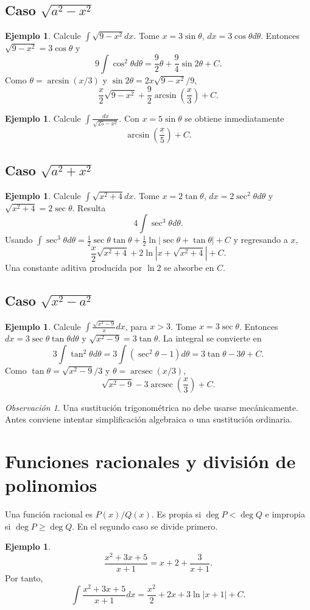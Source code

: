 \documentclass[12pt]{article}
\theoremstyle{definition}
\newtheorem{ejemplo}[teorema]{Ejemplo}
\theoremstyle{remark}
\newtheorem*{observacion}{Observación}
\begin{document}
\subsection*{Caso $\sqrt{a^2-x^2}$}
\begin{ejemplo}Calcule $\int\sqrt{9-x^2}dx$. Tome $x=3\sin\theta$, $dx=3\cos\theta d\theta$. Entonces $\sqrt{9-x^2}=3\cos\theta$ y
\[9\int\cos^2\theta d\theta=\frac92\theta+\frac94\sin2\theta+C.\]
Como $\theta=\arcsin(x/3)$ y $\sin2\theta=2x\sqrt{9-x^2}/9$,
\[\boxed{\frac{x}{2}\sqrt{9-x^2}+\frac92\arcsin\left(\frac{x}{3}\right)+C}.\]\end{ejemplo}
\begin{ejemplo}Calcule $\int\frac{dx}{\sqrt{25-x^2}}$. Con $x=5\sin\theta$ se obtiene inmediatamente
\[\boxed{\arcsin\left(\frac{x}{5}\right)+C}.\]\end{ejemplo}
\subsection*{Caso $\sqrt{a^2+x^2}$}
\begin{ejemplo}Calcule $\int\sqrt{x^2+4}dx$. Tome $x=2\tan\theta$, $dx=2\sec^2\theta d\theta$ y $\sqrt{x^2+4}=2\sec\theta$. Resulta
\[4\int\sec^3\theta d\theta.\]
Usando $\int\sec^3\theta d\theta=\frac12\sec\theta\tan\theta+\frac12\ln|\sec\theta+\tan\theta|+C$ y regresando a $x$,
\[\boxed{\frac{x}{2}\sqrt{x^2+4}+2\ln|x+\sqrt{x^2+4}|+C}.\]
Una constante aditiva producida por $\ln2$ se absorbe en $C$.\end{ejemplo}
\subsection*{Caso $\sqrt{x^2-a^2}$}
\begin{ejemplo}Calcule $\int\frac{\sqrt{x^2-9}}{x}dx$, para $x>3$. Tome $x=3\sec\theta$. Entonces $dx=3\sec\theta\tan\theta d\theta$ y $\sqrt{x^2-9}=3\tan\theta$. La integral se convierte en
\[3\int\tan^2\theta d\theta=3\int(\sec^2\theta-1)d\theta=3\tan\theta-3\theta+C.\]
Como $\tan\theta=\sqrt{x^2-9}/3$ y $\theta=\operatorname{arcsec}(x/3)$,
\[\boxed{\sqrt{x^2-9}-3\operatorname{arcsec}\left(\frac{x}{3}\right)+C}.\]\end{ejemplo}
\begin{observacion}Una sustitución trigonométrica no debe usarse mecánicamente. Antes conviene intentar simplificación algebraica o una sustitución ordinaria.\end{observacion}

\section{Funciones racionales y división de polinomios}
Una función racional es $P(x)/Q(x)$. Es propia si $\deg P<\deg Q$ e impropia si $\deg P\ge\deg Q$. En el segundo caso se divide primero.
\begin{ejemplo}
\[\frac{x^2+3x+5}{x+1}=x+2+\frac3{x+1}.\]
Por tanto,
\[\boxed{\int\frac{x^2+3x+5}{x+1}dx=\frac{x^2}{2}+2x+3\ln|x+1|+C}.\]
\end{ejemplo}
\end{document}
